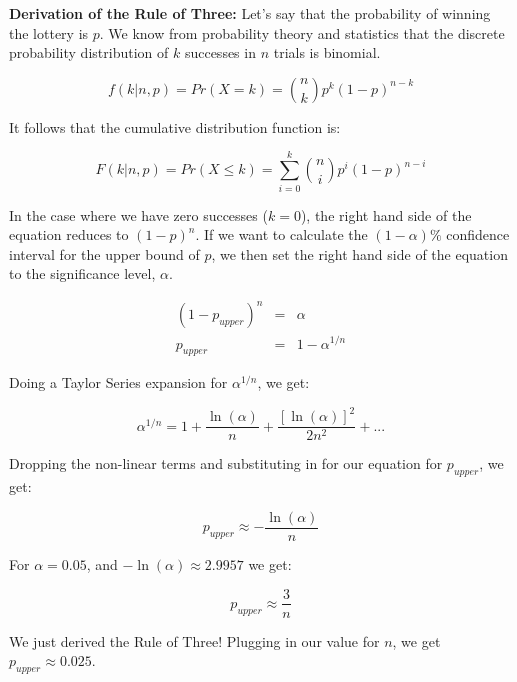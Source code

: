\documentclass[12pt]{article}
\begin{document}
\vspace{5mm}

\textbf{Derivation of the Rule of Three:}
Let's say that the probability of winning the lottery is $p$. We know from probability theory and statistics that the discrete probability distribution of $k$ successes in $n$ trials is binomial. 

$$ f(k|n,p) = Pr(X = k) = {n \choose k} p^k (1 - p)^{n-k} $$

It follows that the cumulative distribution function is:

$$ F(k|n,p) = Pr(X \leq k) = \sum_{i = 0}^{k}  {n \choose i} p^i (1 - p)^{n-i} $$

In the case where we have zero successes ($k=0$), the right hand side of the equation reduces to $(1-p)^n$. If we want to calculate the $(1 - \alpha)\%$ confidence interval for the upper bound of $p$, we then set the right hand side of the equation to the significance level, $\alpha$. 

\begin{eqnarray*}
(1 - p_{upper})^n &=& \alpha\\
p_{upper} &=& 1 - \alpha^{1/n}
\end{eqnarray*}

Doing a Taylor Series expansion for $\alpha^{1/n}$, we get:

$$ \alpha^{1/n} = 1 + \frac{\ln(\alpha)}{n} + \frac{[\ln(\alpha)]^2}{2n^2} + ... $$

Dropping the non-linear terms and substituting in for our equation for $p_{upper}$, we get:

$$ p_{upper} \approx -\frac{\ln(\alpha)}{n}$$

For $\alpha = 0.05$, and $-\ln(\alpha) \approx 2.9957$ we get: 

$$ p_{upper} \approx \frac{3}{n}$$

We just derived the Rule of Three! Plugging in our value for $n$, we get $p_{upper} \approx 0.025$. 
\end{document}
